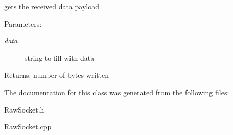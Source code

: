 gets the received data payload 

\begin{Desc}
\item[Parameters:]
\begin{description}
\item[{\em data}]string to fill with data \end{description}
\end{Desc}
\begin{Desc}
\item[Returns:]number of bytes written \end{Desc}


The documentation for this class was generated from the following files:\begin{CompactItemize}
\item 
RawSocket.h\item 
RawSocket.cpp\end{CompactItemize}
